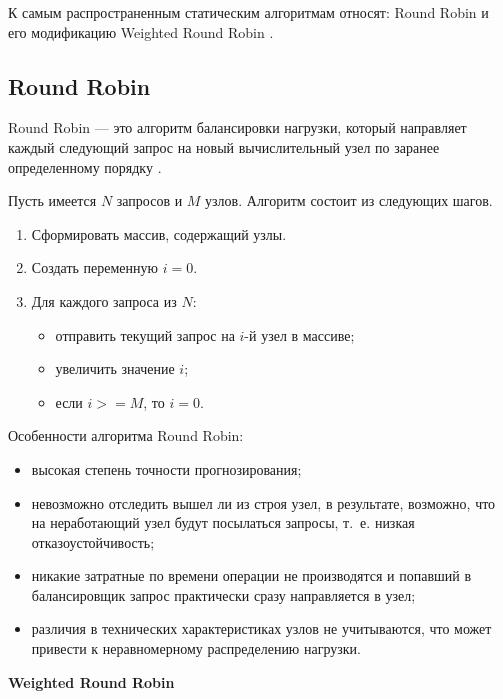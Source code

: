 К самым распространенным статическим алгоритмам относят: Round Robin и его модификацию Weighted Round Robin \cite{drr, comp, part_algos, com_analysis}.

\subsection{Round Robin}

Round Robin --- это алгоритм балансировки нагрузки, который направляет каждый следующий запрос на новый вычислительный узел по заранее определенному порядку \cite{comp}.

Пусть имеется $N$ запросов и $M$ узлов. Алгоритм состоит из следующих шагов.

\begin{enumerate}
	\item Сформировать массив, содержащий узлы.
	\item Создать переменную $i = 0$.
	\item Для каждого запроса из $N$:
	\begin{itemize}
		\item отправить текущий запрос на $i$-й узел в массиве;
		\item увеличить значение $i$;
		\item если $i >= M$, то $i = 0$.
	\end{itemize}	
\end{enumerate}

Особенности алгоритма Round Robin:
\begin{itemize}
	\item высокая степень точности прогнозирования;
	\item невозможно отследить вышел ли из строя узел, в результате, возможно, что на неработающий узел будут посылаться запросы, т.~е. низкая отказоустойчивость;
	\item никакие затратные по времени операции не производятся и попавший в балансировщик запрос практически сразу направляется в узел;
	\item различия в технических характеристиках узлов не учитываются, что может привести к неравномерному распределению нагрузки.
\end{itemize}


\textbf{Weighted Round Robin}


